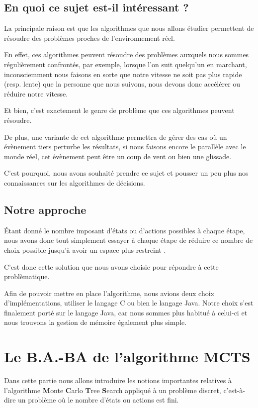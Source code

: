 \documentclass[pdftex,french, english]{article}	%
\begin{document}
	\subsection{En quoi ce sujet est-il intéressant ?}

	La principale raison est que les algorithmes que nous allons étudier permettent de résoudre des problèmes proches de l'environnement réel.

	En effet, ces algorithmes peuvent résoudre des problèmes auxquels nous sommes régulièrement confrontés, par exemple, lorsque l'on suit quelqu'un en marchant, inconsciemment nous faisons en sorte que notre vitesse ne soit pas plus rapide (resp. lente) que la personne que nous suivons, nous devons donc accélérer ou réduire notre vitesse.

	Et bien, c'est exactement le genre de problème que ces algorithmes peuvent résoudre.

	De plus, une variante de cet algorithme permettra de gérer des cas où un évènement tiers perturbe les résultats, si nous faisons encore le parallèle avec le monde réel, cet évènement peut être un coup de vent ou bien une glissade.

	C'est pourquoi, nous avons souhaité prendre ce sujet et pousser un peu plus nos connaissances sur les algorithmes de décisions.
	
	\subsection{Notre approche}
	Étant donné le nombre imposant d'états ou d'actions possibles à chaque étape, nous avons donc tout simplement essayer à chaque étape de réduire ce nombre de choix possible jusqu'à avoir un espace plus restreint \cite{couetoux01}.

	C'est donc cette solution que nous avons choisie pour répondre à cette problèmatique. 

	Afin de pouvoir mettre en place l'algorithme, nous avions deux choix d'implémentations, utiliser le langage C ou bien le langage Java. 
	Notre choix s'est finalement porté sur le langage Java, car nous sommes plus habitué à celui-ci et nous trouvons la gestion de mémoire également plus simple.

\section{Le B.A.-BA de l'algorithme MCTS}

	Dans cette partie nous allons introduire les notions importantes relatives à l'algorithme \textbf{M}onte \textbf{C}arlo \textbf{T}ree \textbf{S}earch \cite{coulom01}
	appliqué à un problème discret, c'est-à-dire un problème où le nombre d'états ou actions est fini.
\end{document}
